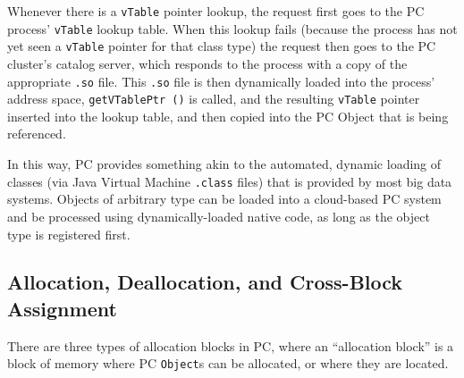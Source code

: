Whenever there is a \texttt{vTable} pointer lookup, the request first goes to the PC process' \texttt{vTable} lookup table.  When this 
lookup fails (because the process has not yet seen a \texttt{vTable} pointer for that class
type) the request then goes to the PC cluster's catalog server, which responds to the process with a copy of the appropriate \texttt{.so} file.  This 
\texttt{.so} file is then 
dynamically loaded into the process' address space, \texttt{getVTablePtr ()} is called, 
and the resulting \texttt{vTable} pointer inserted into the lookup table, and then copied into the PC Object that is being referenced.  

In this way, PC provides something akin to the automated,
dynamic loading of classes (via Java Virtual Machine \texttt{.class} files) that is
provided by most big data systems.  
Objects of arbitrary type can be loaded into a cloud-based PC system and be processed using dynamically-loaded native code, as long
as the object type is registered first.

\subsection{Allocation, Deallocation, and Cross-Block Assignment}

There are three types of allocation blocks in PC, where an ``allocation block'' is a block of memory where PC \texttt{Object}s can be
allocated, or where they are located.

